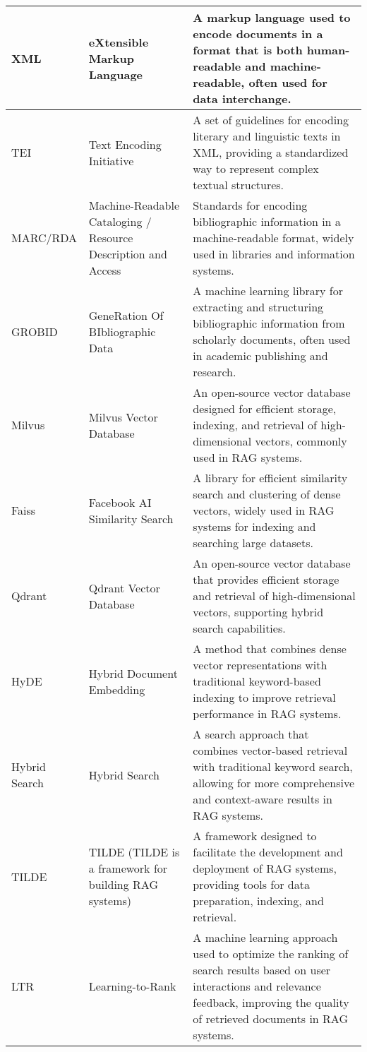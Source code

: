 \begin{tabularx}{\textwidth}{
  >{\raggedright\arraybackslash}p{2.5cm}
  >{\raggedright\arraybackslash}p{4cm}
  >{\noindent\justifying\arraybackslash}X
}
\cmidrule(lr){1-3}
XML & eXtensible Markup Language & A markup language used to encode documents in a format that is both human-readable and machine-readable, often used for data interchange. \\
\cmidrule(lr){1-3}
TEI & Text Encoding Initiative & A set of guidelines for encoding literary and linguistic texts in XML, providing a standardized way to represent complex textual structures. \\
\cmidrule(lr){1-3} 
MARC/RDA & Machine-Readable Cataloging / Resource Description and Access & Standards for encoding bibliographic information in a machine-readable format, widely used in libraries and information systems. \\
GROBID & GeneRation Of BIbliographic Data & A machine learning library for extracting and structuring bibliographic information from scholarly documents, often used in academic publishing and research. \\
Milvus & Milvus Vector Database & An open-source vector database designed for efficient storage, indexing, and retrieval of high-dimensional vectors, commonly used in RAG systems. \\
\cmidrule(lr){1-3}
Faiss  & Facebook AI Similarity Search & A library for efficient similarity search and clustering of
dense vectors, widely used in RAG systems for indexing and searching large datasets. \\
\cmidrule(lr){1-3}
Qdrant & Qdrant Vector Database & An open-source vector database that provides efficient storage and retrieval of high-dimensional vectors, supporting hybrid search capabilities. \\
\cmidrule(lr){1-3}
HyDE  & Hybrid Document Embedding & A method that combines dense vector representations with traditional keyword-based indexing to improve retrieval performance in RAG systems. \\
\cmidrule(lr){1-3}
Hybrid Search & Hybrid Search & A search approach that combines vector-based retrieval with traditional keyword search, allowing for more comprehensive and context-aware results in RAG systems. \\
\cmidrule(lr){1-3}
TILDE & TILDE (TILDE is a framework for building RAG systems) & A framework designed to facilitate the development and deployment of RAG systems, providing tools for data preparation, indexing, and retrieval. \\
\cmidrule(lr){1-3}
LTR   & Learning-to-Rank & A machine learning approach used to optimize the ranking of search results based on user interactions and relevance feedback, improving the quality of retrieved documents in RAG systems. \\

\end{tabularx}
